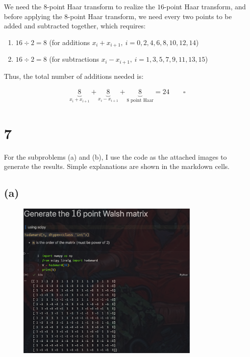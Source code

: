 \documentclass{article}
\begin{document}
We need the $8$-point Haar transform to realize the $16$-point Haar transform, 
and before applying the $8$-point Haar transform, 
we need every two points to be added and subtracted together, 
which requires:

\begin{enumerate}
    \item $16 \div 2 = 8$ (for additions $x_i + x_{i+1}, \ i = 0, 2, 4, 6, 8, 10, 12, 14$)
    \item $16 \div 2 = 8$ (for subtractions $x_i - x_{i+1}, \ i = 1, 3, 5, 7, 9, 11, 13, 15$)
\end{enumerate}

Thus, the total number of additions needed is:

\begin{align*}
    \underbrace{8}_{x_i + x_{i+1}} + \underbrace{8}_{x_i - x_{i+1}} + \underbrace{8}_{\text{8 point Haar}} = 24 \qquad \square
\end{align*}

\section*{7}

For the subproblems (a) and (b), I use the code as the attached images to generate the results.
Simple explanations are shown in the markdown cells.

\subsection*{(a)}


\begin{figure}[H]
    \centering
    \includegraphics[width=0.8\textwidth]{HW5_img/7/gen_walsh.png}
\end{figure}
\end{document}
